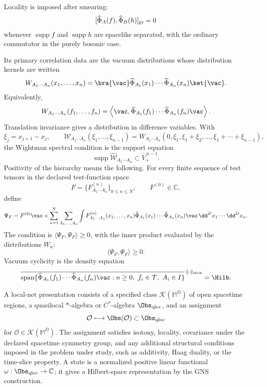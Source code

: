 \begin{definition}
  Locality is imposed after smearing:
  \[
    [\widehat\Phi_A(f),\widehat\Phi_B(h)]_{\rm gr}=0
  \]
  whenever \(\operatorname{supp}f\) and \(\operatorname{supp}h\) are spacelike
  separated, with the ordinary commutator in the purely bosonic case.

  Its primary correlation data are the vacuum distributions whose distribution
  kernels are written
  \[
    W_{A_1\cdots A_n}(x_1,\ldots,x_n)
    =
    \bra{\vac}
    \widehat\Phi_{A_1}(x_1)\cdots\widehat\Phi_{A_n}(x_n)
    \ket{\vac}.
  \]
  Equivalently,
  \[
    W_{A_1\cdots A_n}(f_1,\ldots,f_n)
    =
    \left\langle\vac,
    \widehat\Phi_{A_1}(f_1)\cdots\widehat\Phi_{A_n}(f_n)\vac
    \right\rangle .
  \]
  Translation invariance gives a distribution in difference variables.  With
  \[
    \xi_j=x_{j+1}-x_j,\qquad
    \mathcal W_{A_1\cdots A_n}(\xi_1,\ldots,\xi_{n-1})
    =
    W_{A_1\cdots A_n}
    (0,\xi_1,\xi_1+\xi_2,\ldots,\xi_1+\cdots+\xi_{n-1}),
  \]
  the Wightman spectral condition is the support equation
  \[
    \operatorname{supp}
    \widehat{\mathcal W}_{A_1\cdots A_n}
    \subset
    \overline V_+^{\,n-1}.
  \]
  Positivity of the hierarchy means the following.  For every finite sequence
  of test tensors in the declared test-function space
  \[
    F=\{F^{(n)}_{A_1\cdots A_n}\}_{0\leq n\leq N},
    \qquad
    F^{(0)}\in\mathbb C,
  \]
  define
  \[
    \Psi_F
    =
    F^{(0)}\vac
    +
    \sum_{n=1}^N
    \sum_{A_1,\ldots,A_n}
    \int F^{(n)}_{A_1\cdots A_n}(x_1,\ldots,x_n)
    \widehat\Phi_{A_1}(x_1)\cdots\widehat\Phi_{A_n}(x_n)\vac\,
    \dd^Dx_1\cdots\dd^Dx_n .
  \]
  The condition is \(\langle\Psi_F,\Psi_F\rangle\geq0\), with the inner product
  evaluated by the distributions \(W_n\):
  \[
    \langle\Psi_F,\Psi_F\rangle\ge0.
  \]
  Vacuum cyclicity is the density equation
  \[
    \overline{
    \operatorname{span}\{
    \widehat\Phi_{A_1}(f_1)\cdots\widehat\Phi_{A_n}(f_n)\vac
    : n\ge0,\ f_i\in\mathcal T,\ A_i\in I
    \}
    }^{\,\|\cdot\|_{\Hilb}}
    =
    \Hilb .
  \]
\end{definition}

\begin{definition}
\label{def:local-net-presentation-opening}
  A local-net presentation consists of a specified class
  \(\mathcal K(\mathbb M^D)\) of open spacetime regions, a quasilocal
  \(*\)-algebra or \(C^*\)-algebra \(\Obs_{\rm qloc}\), and an assignment
  \[
    \mathcal O\longmapsto\Obs(\mathcal O)\subset\Obs_{\rm qloc}
  \]
  for \(\mathcal O\in\mathcal K(\mathbb M^D)\).  The assignment satisfies
  isotony, locality, covariance under the declared spacetime symmetry group,
  and any additional structural conditions imposed in the problem under
  study, such as additivity, Haag duality, or the time-slice property.  A
  state is a normalized positive linear functional
  \(\omega:\Obs_{\rm qloc}\to\mathbb C\); it gives a Hilbert-space
  representation by the GNS construction.
\end{definition}

